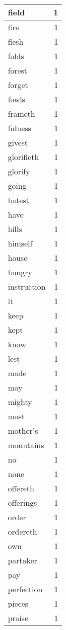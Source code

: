 \begin{center}
\begin{longtable}{l|r}
field & 1 \\ \hline
fire & 1 \\ \hline
flesh & 1 \\ \hline
folds & 1 \\ \hline
forest & 1 \\ \hline
forget & 1 \\ \hline
fowls & 1 \\ \hline
frameth & 1 \\ \hline
fulness & 1 \\ \hline
givest & 1 \\ \hline
glorifieth & 1 \\ \hline
glorify & 1 \\ \hline
going & 1 \\ \hline
hatest & 1 \\ \hline
have & 1 \\ \hline
hills & 1 \\ \hline
himself & 1 \\ \hline
house & 1 \\ \hline
hungry & 1 \\ \hline
instruction & 1 \\ \hline
it & 1 \\ \hline
keep & 1 \\ \hline
kept & 1 \\ \hline
know & 1 \\ \hline
lest & 1 \\ \hline
made & 1 \\ \hline
may & 1 \\ \hline
mighty & 1 \\ \hline
most & 1 \\ \hline
mother's & 1 \\ \hline
mountains & 1 \\ \hline
no & 1 \\ \hline
none & 1 \\ \hline
offereth & 1 \\ \hline
offerings & 1 \\ \hline
order & 1 \\ \hline
ordereth & 1 \\ \hline
own & 1 \\ \hline
partaker & 1 \\ \hline
pay & 1 \\ \hline
perfection & 1 \\ \hline
pieces & 1 \\ \hline
praise & 1 \\ \hline

\end{longtable}
\end{center}
